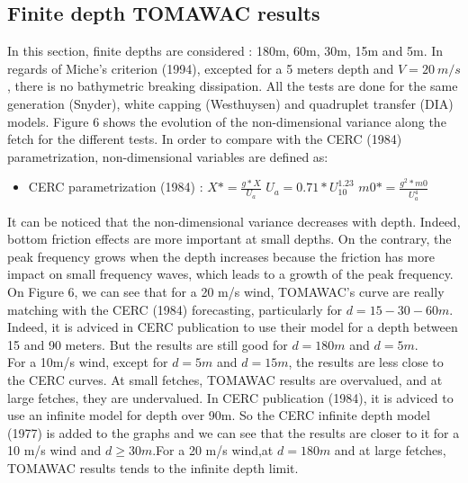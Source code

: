 \documentclass[10pt]{article}
\begin{document}
\subsection{Finite depth TOMAWAC results}
In this section, finite depths are considered : 180m, 60m, 30m, 15m and 5m. In
regards of Miche's criterion (1994), excepted for a 5 meters depth and
$V = 20~m/s$, there is no bathymetric breaking dissipation. All the tests are
done for the same generation (Snyder), white capping (Westhuysen) and
quadruplet transfer (DIA) models. Figure 6 shows the evolution of the
non-dimensional variance along the fetch for the different tests. In order to
compare with the CERC (1984) parametrization, non-dimensional variables are
defined as:\\
\begin{itemize}
\item CERC parametrization (1984) :
\subitem $X* = \frac{g*X}{U_a}$
\subitem $U_a = 0.71*U_{10}^{1.23}$
\subitem $m0* = \frac{g^2*m0}{U_a^4}$
\end{itemize}
It can be noticed that the non-dimensional variance decreases with depth.
Indeed, bottom friction effects are more important at small depths. On the
contrary, the peak frequency grows when the depth increases because the
friction has more impact on small frequency waves, which leads to a growth of
the peak frequency.\\
On Figure 6, we can see that for a 20 m/s wind, TOMAWAC's curve are really
matching with the CERC (1984) forecasting, particularly for
$d = 15 - 30 - 60 m$. Indeed, it is adviced in CERC publication to use their
model for a depth between 15 and 90 meters. But the results are still good for
$d = 180 m$ and $d = 5 m$.\\
For a 10m/s wind, except for $d = 5 m $ and $d = 15 m$, the results are less
close to the CERC curves. At small fetches, TOMAWAC results are overvalued,
and at large fetches, they are undervalued. In CERC publication (1984), it is
adviced to use an infinite model for depth over 90m. So the CERC infinite
depth model (1977) is added to the graphs and we can see that the results are
closer to it for a 10 m/s wind and $d \geq 30m$.For a 20 m/s wind,at $d = 180m$
and at large fetches, TOMAWAC results tends to the infinite depth limit.
\end{document}
